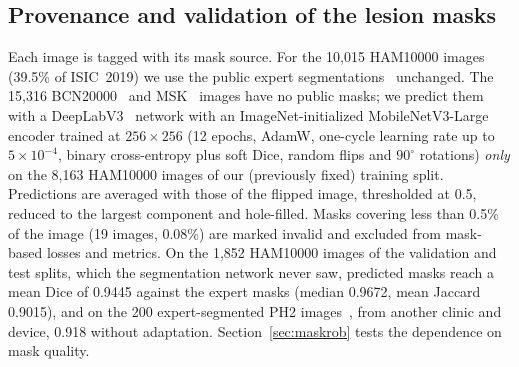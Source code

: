 \documentclass[conference]{IEEEtran}
\begin{document}
\subsection{Provenance and validation of the lesion masks}
Each image is tagged with its mask source. For the 10{,}015 HAM10000 images (39.5\% of ISIC~2019) we use the public expert segmentations~\cite{tschandl2018} unchanged. The 15{,}316 BCN20000~\cite{combalia2019} and MSK~\cite{codella2018} images have no public masks; we predict them with a DeepLabV3~\cite{chen2017deeplab} network with an ImageNet-initialized MobileNetV3-Large~\cite{howard2019} encoder trained at $256\times256$ (12 epochs, AdamW, one-cycle learning rate up to $5\times10^{-4}$, binary cross-entropy plus soft Dice, random flips and $90^\circ$ rotations) \emph{only} on the 8{,}163 HAM10000 images of our (previously fixed) training split. Predictions are averaged with those of the flipped image, thresholded at 0.5, reduced to the largest component and hole-filled. Masks covering less than 0.5\% of the image (19 images, 0.08\%) are marked invalid and excluded from mask-based losses and metrics. On the 1{,}852 HAM10000 images of the validation and test splits, which the segmentation network never saw, predicted masks reach a mean Dice of 0.9445 against the expert masks (median 0.9672, mean Jaccard 0.9015), and on the 200 expert-segmented PH2 images~\cite{mendonca2013}, from another clinic and device, 0.918 without adaptation. Section~\ref{sec:maskrob} tests the dependence on mask quality.
\end{document}
